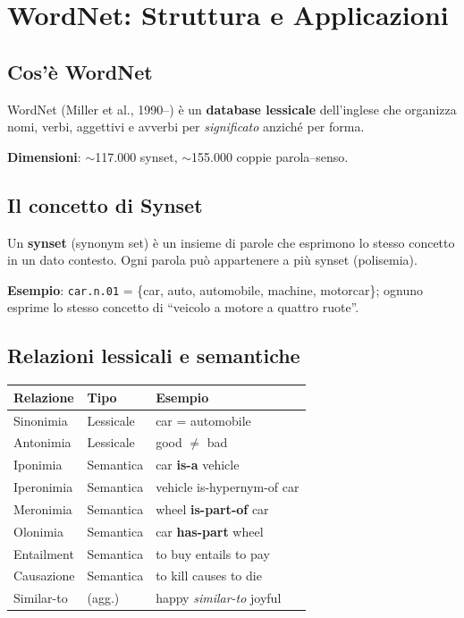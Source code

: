\documentclass[12pt,a4paper]{article}
\begin{document}
\section{WordNet: Struttura e Applicazioni}

\subsection{Cos'è WordNet}

WordNet (Miller et al., 1990--) è un \textbf{database lessicale} dell'inglese che organizza nomi, verbi, aggettivi e avverbi per \emph{significato} anziché per forma.

\begin{defbox}
\textbf{Dimensioni}: $\sim$117.000 synset, $\sim$155.000 coppie parola--senso.
\end{defbox}

\subsection{Il concetto di Synset}

\begin{defbox}
Un \textbf{synset} (synonym set) è un insieme di parole che esprimono lo stesso concetto in un dato contesto. Ogni parola può appartenere a più synset (polisemia).
\end{defbox}

\textbf{Esempio}: \texttt{car.n.01} = \{car, auto, automobile, machine, motorcar\}; ognuno esprime lo stesso concetto di ``veicolo a motore a quattro ruote''.

\subsection{Relazioni lessicali e semantiche}

\begin{center}
\begin{tabular}{lll}
\toprule
\textbf{Relazione} & \textbf{Tipo} & \textbf{Esempio} \\
\midrule
Sinonimia & Lessicale & car = automobile \\
Antonimia & Lessicale & good $\neq$ bad \\
Iponimia & Semantica & car \textbf{is-a} vehicle \\
Iperonimia & Semantica & vehicle is-hypernym-of car \\
Meronimia & Semantica & wheel \textbf{is-part-of} car \\
Olonimia & Semantica & car \textbf{has-part} wheel \\
Entailment & Semantica & to buy entails to pay \\
Causazione & Semantica & to kill causes to die \\
Similar-to & (agg.) & happy \textit{similar-to} joyful \\
\bottomrule
\end{tabular}
\end{center}
\end{document}
